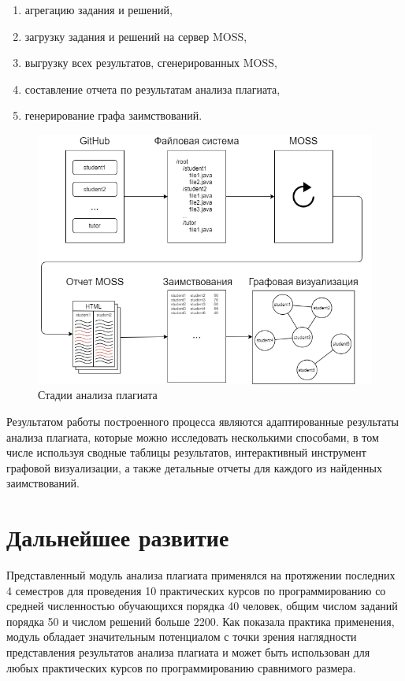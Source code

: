 \documentclass[a4paper,14pt]{extarticle}
\begin{document}
\begin{enumerate}
    \item агрегацию задания и решений,
    \item загрузку задания и решений на сервер MOSS,
    \item выгрузку всех результатов, сгенерированных MOSS,
    \item составление отчета по результатам анализа плагиата,
    \item генерирование графа заимствований.
\end{enumerate}

\begin{figure}[h!]
\centering
\includegraphics[width=1.0\textwidth]{plagiarism_pipeline.png}
\caption{Стадии анализа плагиата}
\label{fig:pipeline}
\end{figure}

Результатом работы построенного процесса являются адаптированные результаты анализа плагиата, которые можно исследовать несколькими способами, в том числе используя сводные таблицы результатов, интерактивный инструмент графовой визуализации, а также детальные отчеты для каждого из найденных заимствований.

\section{Дальнейшее развитие}

Представленный модуль анализа плагиата применялся на протяжении последних 4 семестров для проведения 10 практических курсов по программированию со средней численностью обучающихся порядка 40 человек, общим числом заданий порядка 50 и числом решений больше 2200. Как показала практика применения, модуль обладает значительным потенциалом с точки зрения наглядности представления результатов анализа плагиата и может быть использован для любых практических курсов по программированию сравнимого размера.
\end{document}
